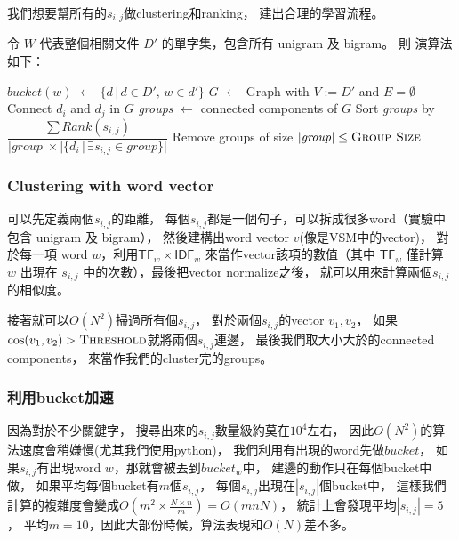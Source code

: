 我們想要幫所有的$s_{i,j}$做clustering和ranking，
建出合理的學習流程。

令 $W$ 代表整個相關文件 $D'$ 的單字集，包含所有 unigram 及 bigram。
則  演算法如下：

\begin{algorithmic}
      \State $\mathit{bucket}(w)$ $\gets$ $\{d\,|\,d\in D',\,w\in d'\}$
    \EndFor
    \State $G$ $\gets$ Graph with $V:=D'$ and $E=\emptyset$
        \State Connect $d_i$ and $d_j$ in $G$
      \EndFor
    \EndFor
    \State \textit{groups} $\gets$ connected components of $G$
    \State
    \State Sort \textit{groups} by $\dfrac{\sum \mathit{Rank}(s_{i,j})}{|\mathit{group}|\times |\{d_i \,|\, \exists s_{i,j} \in group\}|}$
    \State
    \State Remove groups of size $|\mathit{group}|\le\text{\textproc{Group Size}}$
  \EndFunction
\end{algorithmic}


\subsubsection{Clustering with word vector}

可以先定義兩個$s_{i,j}$的距離，
每個$s_{i,j}$都是一個句子，可以拆成很多word（實驗中包含 unigram 及 bigram），
然後建構出word vector $v$(像是VSM中的vector)，
對於每一項 word $w$，利用$\mathsf{TF}_w\times\mathsf{IDF}_w$
來當作vector該項的數值（其中 $\mathsf{TF}_w$ 僅計算 $w$ 出現在 $s_{i,j}$
中的次數），最後把vector normalize之後，
就可以用來計算兩個$s_{i,j}$的相似度。

接著就可以$O(N^{2})$掃過所有個$s_{i,j}$，
對於兩個$s_{i,j}$的vector $v_1,v_2$，
如果$\cos(v_1,v_2) > \text{\textproc{Threshold}}$就將兩個$s_{i,j}$連邊，
最後我們取大小大於的connected components，
來當作我們的cluster完的groups。

\subsubsection{利用bucket加速}
因為對於不少關鍵字，
搜尋出來的$s_{i,j}$數量級約莫在$10^4$左右，
因此$O(N^{2})$的算法速度會稍嫌慢(尤其我們使用python)，
我們利用有出現的word先做$\mathit{bucket}$，
如果$s_{i,j}$有出現word $w$，那就會被丟到$bucket_w$中，
建邊的動作只在每個bucket中做，
如果平均每個bucket有$m$個$s_{i,j}$，
每個$s_{i,j}$出現在$|s_{i,j}|$個bucket中，
這樣我們計算的複雜度會變成$O(m^2\times \frac{N\times n}{m}) = O(mnN)$，
統計上會發現平均$|s_{i,j}| = 5$，
平均$m = 10$，因此大部份時候，算法表現和$O(N)$差不多。

